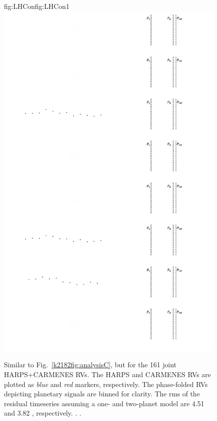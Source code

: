 \begin{figure}
\begin{ocg}{fig:LHCon}{fig:LHCon}{1}
  \includegraphics[width=0.8\hsize]{figures/analysisHC161_lines.png}%
  \end{ocg}
  \hspace{-0.8\hsize}%
  \caption[RV timeseries and models from analysis of the joint K2-18 RVs from HARPS and CARMENES.]
    {\small Similar to Fig.~\ref{k2182fig:analysisC}, but for the 161 joint HARPS+CARMENES RVs.
    The HARPS and CARMENES RVs are plotted as \emph{blue} and \emph{red} markers, respectively.
    The phase-folded RVs depicting planetary signals are binned for clarity.
    The rms of the residual timeseries assuming a one- and two-planet model are
    4.51 and 3.82 \mps{}, respectively.
    .
    .}
  \label{k2182fig:analysisHC}
\end{figure}



